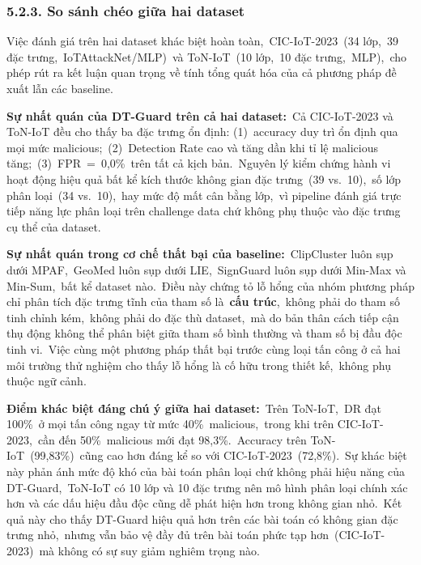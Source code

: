 \subsubsection{5.2.3. So sánh chéo giữa hai dataset}\label{so-suxe1nh-chuxe9o-giux1eefa-hai-dataset}

Việc đánh giá trên hai dataset khác biệt hoàn toàn,~CIC-IoT-2023~(34 lớp,~39 đặc trưng,~IoTAttackNet/MLP)~và ToN-IoT~(10 lớp,~10 đặc trưng,~MLP),~cho phép rút ra kết luận quan trọng về tính tổng quát hóa của cả phương pháp đề xuất lẫn các baseline.

\textbf{Sự nhất quán của DT-Guard trên cả hai dataset:}~Cả CIC-IoT-2023 và ToN-IoT đều cho thấy ba đặc trưng ổn định: (1)~accuracy duy trì ổn định qua mọi mức malicious;~(2)~Detection Rate cao và tăng dần khi tỉ lệ malicious tăng;~(3)~FPR~=~0,0\%~trên tất cả kịch bản.~Nguyên lý kiểm chứng hành vi hoạt động hiệu quả bất kể kích thước không gian đặc trưng~(39 vs.~10),~số lớp phân loại~(34 vs.~10),~hay mức độ mất cân bằng lớp,~vì pipeline đánh giá trực tiếp năng lực phân loại trên challenge data chứ không phụ thuộc vào đặc trưng cụ thể của dataset.

\textbf{Sự nhất quán trong cơ chế thất bại của baseline:}~ClipCluster luôn sụp dưới MPAF,~GeoMed luôn sụp dưới LIE,~SignGuard luôn sụp dưới Min-Max và Min-Sum,~bất kể dataset nào.~Điều này chứng tỏ lỗ hổng của nhóm phương pháp chỉ phân tích đặc trưng tĩnh của tham số là~\textbf{cấu trúc},~không phải do tham số tinh chỉnh kém,~không phải do đặc thù dataset,~mà do bản thân cách tiếp cận thụ động không thể phân biệt giữa tham số bình thường và tham số bị đầu độc tinh vi.~Việc cùng một phương pháp thất bại trước cùng loại tấn công ở cả hai môi trường thử nghiệm cho thấy lỗ hổng là cố hữu trong thiết kế,~không phụ thuộc ngữ cảnh.

\textbf{Điểm khác biệt đáng chú ý giữa hai dataset:}~Trên ToN-IoT,~DR đạt 100\%~ở mọi tấn công ngay từ mức 40\%~malicious,~trong khi trên CIC-IoT-2023,~cần đến 50\%~malicious mới đạt 98,3\%.~Accuracy trên ToN-IoT~(99,83\%)~cũng cao hơn đáng kể so với CIC-IoT-2023~(72,8\%).~Sự khác biệt này phản ánh mức độ khó của bài toán phân loại chứ không phải hiệu năng của DT-Guard,~ToN-IoT có 10 lớp và 10 đặc trưng nên mô hình phân loại chính xác hơn và các dấu hiệu đầu độc cũng dễ phát hiện hơn trong không gian nhỏ.~Kết quả này cho thấy DT-Guard hiệu quả hơn trên các bài toán có không gian đặc trưng nhỏ,~nhưng vẫn bảo vệ đầy đủ trên bài toán phức tạp hơn~(CIC-IoT-2023)~mà không có sự suy giảm nghiêm trọng nào.


